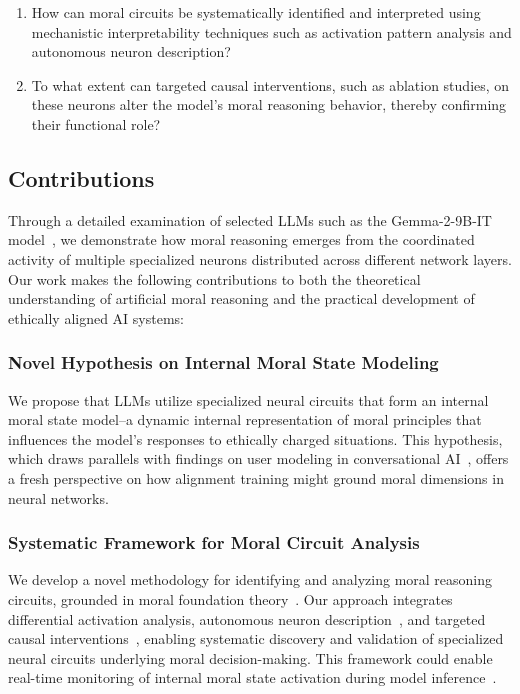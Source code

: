 \documentclass[runninghheads]{llncs}
\begin{document}
\begin{enumerate}
    \item How can moral circuits be systematically identified and interpreted using mechanistic interpretability techniques such as activation pattern analysis and autonomous neuron description?
    \item To what extent can targeted causal interventions, such as ablation studies, on these neurons alter the model's moral reasoning behavior, thereby confirming their functional role?
\end{enumerate}

\subsection{Contributions}

Through a detailed examination of selected LLMs such as the Gemma-2-9B-IT model~\cite{Gemma2024}, we demonstrate how moral reasoning emerges from the coordinated activity of multiple specialized neurons distributed across different network layers. Our work makes the following contributions to both the theoretical understanding of artificial moral reasoning and the practical development of ethically aligned AI systems:

\subsubsection{Novel Hypothesis on Internal Moral State Modeling}
We propose that LLMs utilize specialized neural circuits that form an internal moral state model--a dynamic internal representation of moral principles that influences the model's responses to ethically charged situations. This hypothesis, which draws parallels with findings on user modeling in conversational AI~\cite{chen_designing_2024}, offers a fresh perspective on how alignment training might ground moral dimensions in neural networks.

\subsubsection{Systematic Framework for Moral Circuit Analysis}
We develop a novel methodology for identifying and analyzing moral reasoning circuits, grounded in moral foundation theory~\cite{Haidt2004}. Our approach integrates differential activation analysis, autonomous neuron description~\cite{bills2023language}, and targeted causal interventions~\cite{Yamakoshi2023}, enabling systematic discovery and validation of specialized neural circuits underlying moral decision-making. This framework could enable real-time monitoring of internal moral state activation during model inference~\cite{chen_designing_2024}.
\end{document}
